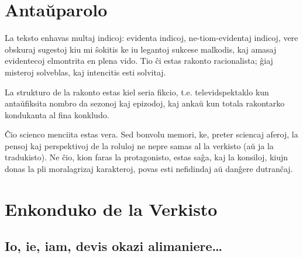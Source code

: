 \chapter*{Antaŭparolo}

La teksto enhavas multaj indicoj: evidenta indicoj, ne-tiom-evidentaj indicoj, vere obskuraj sugestoj kiu mi ŝokitis ke iu legantoj sukcese malkodis, kaj amasaj evidentecoj elmontrita en plena vido. Tio ĉi estas rakonto racionalista; ĝiaj misteroj solveblas, kaj intencitis esti solvitaj.

La strukturo de la rakonto estas kiel seria fikcio, t.e. televidspektaklo kun antaŭfiksita nombro da sezonoj kaj epizodoj, kaj ankaŭ kun totala rakontarko kondukanta al fina konkludo.


Ĉio scienco menciita estas vera. Sed bonvolu memori, ke, preter sciencaj aferoj, la pensoj kaj perspektivoj de la roluloj ne nepre samas al la verkisto (aŭ ja la tradukisto). Ne ĉio, kion faras la protagonisto, estas saĝa, kaj la konsiloj, kiujn donas la pli moralagrizaj karakteroj, povas esti nefidindaj aŭ danĝere dutranĉaj.

\chapter*{Enkonduko de la Verkisto}

\section*{Io, ie, iam, devis okazi alimaniere…}

